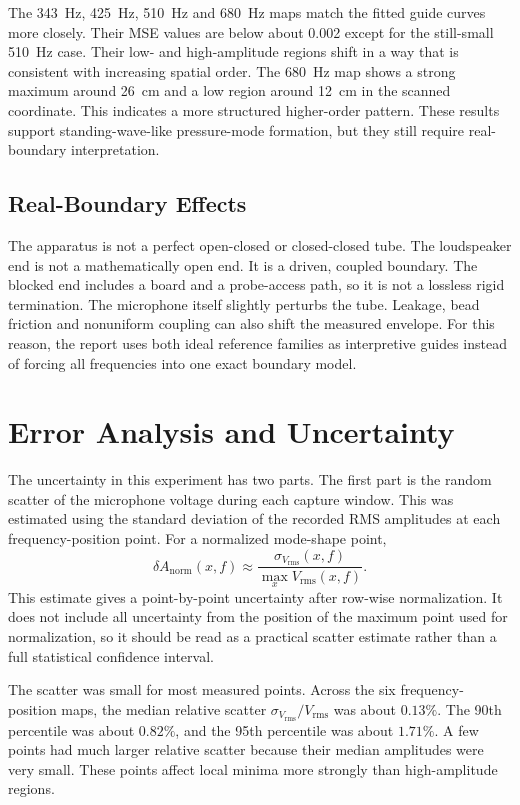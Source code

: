 \documentclass[11pt,a4paper]{article}
\newcommand{\rms}{V_{\mathrm{rms}}}
\newcommand{\anorm}{A_{\mathrm{norm}}}
\begin{document}
The \SI{343}{Hz}, \SI{425}{Hz}, \SI{510}{Hz} and \SI{680}{Hz} maps match the fitted guide curves more closely. Their MSE values are below about 0.002 except for the still-small \SI{510}{Hz} case. Their low- and high-amplitude regions shift in a way that is consistent with increasing spatial order. The \SI{680}{Hz} map shows a strong maximum around \SI{26}{cm} and a low region around \SI{12}{cm} in the scanned coordinate. This indicates a more structured higher-order pattern. These results support standing-wave-like pressure-mode formation, but they still require real-boundary interpretation.

\subsection{Real-Boundary Effects}

The apparatus is not a perfect open-closed or closed-closed tube. The loudspeaker end is not a mathematically open end. It is a driven, coupled boundary. The blocked end includes a board and a probe-access path, so it is not a lossless rigid termination. The microphone itself slightly perturbs the tube. Leakage, bead friction and nonuniform coupling can also shift the measured envelope. For this reason, the report uses both ideal reference families as interpretive guides instead of forcing all frequencies into one exact boundary model.

\section{Error Analysis and Uncertainty}

The uncertainty in this experiment has two parts. The first part is the random scatter of the microphone voltage during each capture window. This was estimated using the standard deviation of the recorded RMS amplitudes at each frequency-position point. For a normalized mode-shape point,
\begin{equation}
  \delta \anorm(x,f)\approx \frac{\sigma_{\rms}(x,f)}{\max_x \rms(x,f)}.
\end{equation}
This estimate gives a point-by-point uncertainty after row-wise normalization. It does not include all uncertainty from the position of the maximum point used for normalization, so it should be read as a practical scatter estimate rather than a full statistical confidence interval.

The scatter was small for most measured points. Across the six frequency-position maps, the median relative scatter \(\sigma_{\rms}/\rms\) was about \(0.13\%\). The 90th percentile was about \(0.82\%\), and the 95th percentile was about \(1.71\%\). A few points had much larger relative scatter because their median amplitudes were very small. These points affect local minima more strongly than high-amplitude regions.
\end{document}
